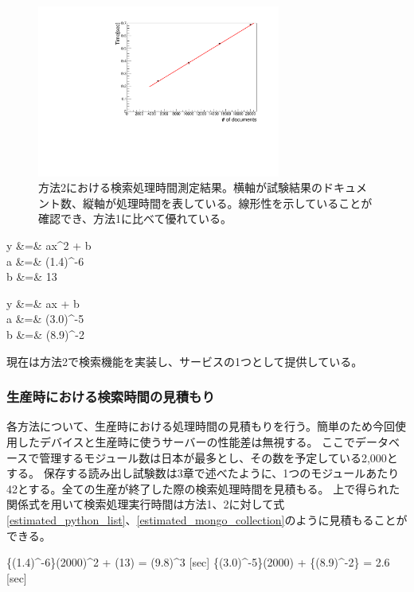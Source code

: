 \begin{figure}[bpt]
  \begin{center}
  \includegraphics[width=8cm,angle=270]{result_mongo_collection_search.pdf}
  \caption[方法2における検索処理時間測定結果]{方法2における検索処理時間測定結果。横軸が試験結果のドキュメント数、縦軸が処理時間を表している。線形性を示していることが確認でき、方法1に比べて優れている。}
  \label{searching_time}
  \end{center}
\end{figure}

\bbb
y &=&  ax^2 + b \\
\label{function_python_list}
a &=& (1.4)^{-6} \nonumber \\
b &=& 13 \nonumber
\eee

\bbb
y &=& ax + b \\
\label{function_mongo_collection}
a &=& (3.0)^{-5} \nonumber \\
b &=& (8.9)^{-2} \nonumber
\eee

現在は方法2で検索機能を実装し、サービスの1つとして提供している。

\subsubsection{生産時における検索時間の見積もり}
各方法について、生産時における処理時間の見積もりを行う。簡単のため今回使用したデバイスと生産時に使うサーバーの性能差は無視する。
ここでデータベースで管理するモジュール数は日本が最多とし、その数を予定している2,000とする。
保存する読み出し試験数は3章で述べたように、1つのモジュールあたり42とする。全ての生産が終了した際の検索処理時間を見積もる。
上で得られた関係式を用いて検索処理実行時間は方法1、2に対して式\ref{estimated_python_list}、\ref{estimated_mongo_collection}のように見積もることができる。

\bbb
\{(1.4)^{-6}\}\times(2000)^2 + (13) = (9.8)^{3} [\rm{sec}]
\label{estimated_python_list}
\eee
\bbb
\{(3.0)^{-5}\}\times(2000) + \{(8.9)^{-2}\} = 2.6 [\rm{sec}]
\label{estimated_mongo_collection}
\eee

